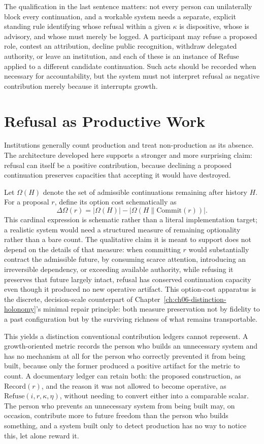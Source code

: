 The qualification in the last sentence matters: not every person can unilaterally block every continuation, and a workable system needs a separate, explicit standing rule identifying whose refusal within a given $\kappa$ is dispositive, whose is advisory, and whose must merely be logged. A participant may refuse a proposed role, contest an attribution, decline public recognition, withdraw delegated authority, or leave an institution, and each of these is an instance of $\mathrm{Refuse}$ applied to a different candidate continuation. Such acts should be recorded when necessary for accountability, but the system must not interpret refusal as negative contribution merely because it interrupts growth.

\section{Refusal as Productive Work}

Institutions generally count production and treat non-production as its absence. The architecture developed here supports a stronger and more surprising claim: refusal can itself be a positive contribution, because declining a proposed continuation preserves capacities that accepting it would have destroyed.

Let $\Omega(H)$ denote the set of admissible continuations remaining after history $H$. For a proposal $r$, define its option cost schematically as
\[
\Delta\Omega(r) = |\Omega(H)| - |\Omega(H \parallel \mathrm{Commit}(r))|.
\]
This cardinal expression is schematic rather than a literal implementation target; a realistic system would need a structured measure of remaining optionality rather than a bare count. The qualitative claim it is meant to support does not depend on the details of that measure: when committing $r$ would substantially contract the admissible future, by consuming scarce attention, introducing an irreversible dependency, or exceeding available authority, while refusing it preserves that future largely intact, refusal has conserved continuation capacity even though it produced no new operative artifact. This option-cost apparatus is the discrete, decision-scale counterpart of Chapter~\ref{ch:ch06-distinction-holonomy}'s minimal repair principle: both measure preservation not by fidelity to a past configuration but by the surviving richness of what remains transportable.

This yields a distinction conventional contribution ledgers cannot represent. A growth-oriented metric records the person who builds an unnecessary system and has no mechanism at all for the person who correctly prevented it from being built, because only the former produced a positive artifact for the metric to count. A documentary ledger can retain both: the proposed construction, as $\mathrm{Record}(r)$, and the reason it was not allowed to become operative, as $\mathrm{Refuse}(i,r,\kappa,\eta)$, without needing to convert either into a comparable scalar. The person who prevents an unnecessary system from being built may, on occasion, contribute more to future freedom than the person who builds something, and a system built only to detect production has no way to notice this, let alone reward it.


